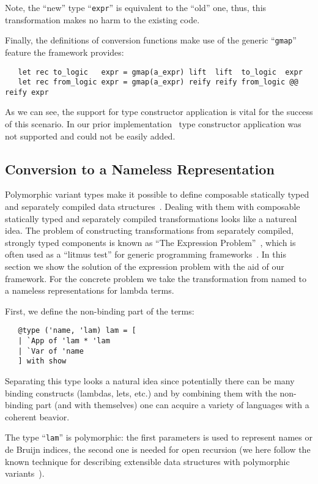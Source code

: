Note, the ``new'' type ``\lstinline{expr}'' is equivalent to the ``old'' one, thus, this transformation makes no
harm to the existing code.

Finally, the definitions of conversion functions make use of the generic ``\lstinline{gmap}'' feature the
framework provides:

\begin{lstlisting}
   let rec to_logic   expr = gmap(a_expr) lift  lift  to_logic  expr
   let rec from_logic expr = gmap(a_expr) reify reify from_logic @@ reify expr
\end{lstlisting}

As we can see, the support for type constructor application is vital for the success of this scenario. In our prior
implementation~\cite{TransformationObjects} type constructor application was not supported and could not be easily added.

\subsection{Conversion to a Nameless Representation}

Polymorphic variant types make it possible to define composable statically typed and separately compiled data structures~\cite{PolyVarReuse}.
Dealing with them with composable statically typed and separately compiled transformations looks like a natureal idea. The problem of
constructing transformations from separately compiled, strongly typed components is known as ``The Expression Problem''~\cite{ExpressionProblem}, which
is often used as a ``litmus test'' for generic programming frameworks~\cite{ObjectAlgebras,ALaCarte}. In this section we show the solution of
the expression problem with the aid of our framework. For the concrete problem we take the transformation from named to a nameless representations
for lambda terms.

First, we define the non-binding part of the terms:

\begin{lstlisting}
   @type ('name, 'lam) lam = [
   | `App of 'lam * 'lam
   | `Var of 'name
   ] with show
\end{lstlisting}

Separating this type looks a natural idea since potentially there can be many binding constructs (lambdas, lets, etc.) and by combining them
with the non-binding part (and with themselves) one can acquire a variety of languages with a coherent beavior.

The type ``\lstinline{lam}'' is polymorphic: the first parameters is used to represent names or de Bruijn indices, the second one is needed
for open recursion (we here follow the known technique for describing extensible data structures with polymorphic variants~\cite{PolyVarReuse}).

